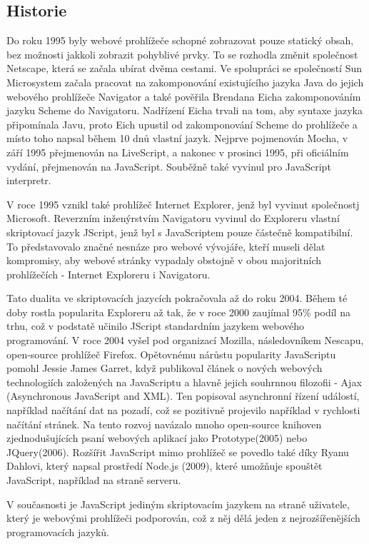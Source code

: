 \documentclass[main.tex]{subfiles}
\begin{document}
\subsection{Historie}
Do roku 1995 byly webové prohlížeče schopné zobrazovat pouze statický obsah, bez možnosti jakkoli zobrazit pohyblivé prvky. To se rozhodla změnit společnost Netscape, která se začala ubírat dvěma cestami. Ve spolupráci se společností Sun Microsystem začala pracovat na zakomponování existujícího jazyka Java do jejich webového prohlížeče Navigator a také pověřila Brendana Eicha zakomponováním jazyku Scheme do Navigatoru. Nadřízení Eicha trvali na tom, aby syntaxe jazyka připomínala Javu, proto Eich upustil od zakomponování Scheme do prohlížeče a místo toho napsal během 10 dnů vlastní jazyk. Nejprve pojmenován Mocha, v září 1995 přejmenován na LiveScript, a nakonec v prosinci 1995, při oficiálním vydání, přejmenován na JavaScript. Souběžně také vyvinul pro JavaScript interpretr.

V roce 1995 vznikl také prohlížeč Internet Explorer, jenž byl vyvinut společnostj Microsoft. Reverzním inženýrstvím Navigatoru vyvinul do Exploreru vlastní skriptovací jazyk JScript, jenž byl s JavaScriptem pouze částečně kompatibilní. To představovalo značné nesnáze pro webové vývojáře, kteří museli dělat kompromisy, aby webové stránky vypadaly obstojně v obou majoritních prohlížečích - Internet Exploreru i Navigatoru. 

Tato dualita ve skriptovacích jazycích pokračovala až do roku 2004. Během té doby rostla popularita Exploreru až tak, že v roce 2000 zaujímal 95\% podíl na trhu, což v podstatě učinilo JScript standardním jazykem webového programování. V roce 2004 vyšel pod organizací Mozilla, následovníkem Nescapu, open-source prohlížeč Firefox. 
Opětovnému nárůstu popularity JavaScriptu pomohl Jessie James Garret, když publikoval článek o nových webových technologiích založených na JavaScriptu a hlavně jejich souhrnnou filozofii - Ajax (Asynchronous JavaScript and XML). Ten popisoval asynchronní řízení událostí, například načítání dat na pozadí, což se pozitivně projevilo například v rychlosti načítání stránek. Na tento rozvoj navázalo mnoho open-source knihoven zjednodušujících psaní webových aplikací jako Prototype(2005) nebo JQuery(2006).
Rozšířit JavaScript mimo prohlížeč se povedlo také díky Ryanu Dahlovi, který napsal prostředí Node.js (2009), které umožňuje spouštět JavaScript, například na straně serveru. \cite{web:wik:cz:js, web:wik:en:js} 

V současnosti je JavaScript jediným skriptovacím jazykem na straně uživatele, který je webovými prohlížeči podporován, což z něj dělá jeden z nejrozšířenějších programovacích jazyků. \cite{web:wik:cz:js} 

\end{document}
